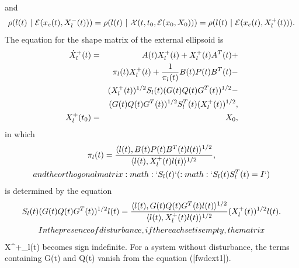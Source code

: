 \documentclass[letterpaper,10pt,english]{sphinxmanual}
\begin{document}
and
\begin{gather}
\begin{split}\rho(l(t) ~|~ {\mathcal E}(x_c(t), X^-_l(t))) =
\rho(l(t) ~|~ {\mathcal X}(t, t_0, {\mathcal E}(x_0,X_0))) =
\rho(l(t) ~|~ {\mathcal E}(x_c(t), X^+_l(t))) .
\label{fwdtightness}\end{split}\notag
\end{gather}
The equation for the shape matrix of the external ellipsoid is
\begin{gather}
\begin{split}\begin{aligned}
\dot{X}^+_l(t) & = & A(t)X^+_l(t) + X^+_l(t)A^T(t) +\nonumber \\
& & \pi_l(t)X^+_l(t) + \frac{1}{\pi_l(t)}B(t)P(t)B^T(t) -\nonumber \\
& & (X_l^{+}(t))^{1/2}S_l(t)(G(t)Q(t)G^T(t))^{1/2} \nonumber -\\
& & (G(t)Q(t)G^T(t))^{1/2}S_l^T(t)(X_l^{+}(t))^{1/2}, \label{fwdext1} \\
X^+_l(t_0) & = & X_0, \label{fwdext2}\end{aligned}\end{split}\notag
\end{gather}
in which
\begin{gather}
\begin{split}  \pi_l(t) = \frac{\langle l(t),
  B(t)P(t)B^T(t)l(t)\rangle^{1/2}}{\langle l(t), X^+_l(t)l(t)\rangle^{1/2}},\end{split}\notag\\\begin{split}and the orthogonal matrix :math:`S_l(t)` (:math:`S_l(t)S_l^T(t) = I`)\end{split}\notag
\end{gather}
is determined by the equation
\begin{gather}
\begin{split}  S_l(t)(G(t)Q(t)G^T(t))^{1/2}l(t) = \frac{\langle l(t),
  G(t)Q(t)G^T(t)l(t)\rangle^{1/2}}{\langle l(t),
  X_l^+(t)l(t)\rangle^{1/2}}(X_l^{+}(t))^{1/2}l(t).\end{split}\notag\\\begin{split}In the presence of disturbance, if the reach set is empty, the matrix\end{split}\notag
\end{gather}
X^+_l(t) becomes sign indefinite. For a system without
disturbance, the terms containing G(t) and Q(t) vanish
from the equation ({[}fwdext1{]}).
\end{document}
